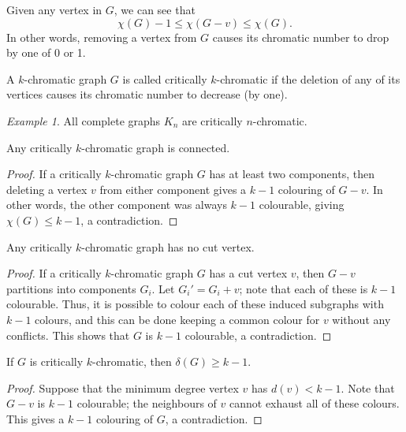 \documentclass[11pt]{article}
\theoremstyle{definition}
\theoremstyle{remark}
\newtheorem*{example}{Example}
\numberwithin{equation}{section}
\begin{document}
    \begin{lemma}
        Given any vertex in $G$, we can see that \[
            \chi(G) - 1 \leq \chi(G - v) \leq \chi(G).
        \] In other words, removing a vertex from $G$ causes its chromatic number to
        drop by one of 0 or 1.
    \end{lemma}

    \begin{definition}
        A $k$-chromatic graph $G$ is called critically $k$-chromatic if the deletion
        of any of its vertices causes its chromatic number to decrease (by one).
    \end{definition}
    \begin{example}
        All complete graphs $K_n$ are critically $n$-chromatic.
    \end{example}

    \begin{lemma}
        Any critically $k$-chromatic graph is connected.
    \end{lemma}
    \begin{proof}
        If a critically $k$-chromatic graph $G$ has at least two components, then
        deleting a vertex $v$ from either component gives a $k - 1$ colouring of $G -
        v$. In other words, the other component was always $k - 1$ colourable, giving
        $\chi(G) \leq k - 1$, a contradiction.
    \end{proof}

    \begin{lemma}
        Any critically $k$-chromatic graph has no cut vertex.
    \end{lemma}
    \begin{proof}
        If a critically $k$-chromatic graph $G$ has a cut vertex $v$, then $G - v$
        partitions into components $G_i$. Let $G_i' = G_i + v$; note that each of
        these is $k - 1$ colourable. Thus, it is possible to colour each of these
        induced subgraphs with $k - 1$ colours, and this can be done keeping a common
        colour for $v$ without any conflicts. This shows that $G$ is $k - 1$
        colourable, a contradiction.
    \end{proof}

    \begin{lemma}
        If $G$ is critically $k$-chromatic, then $\delta(G) \geq k - 1$.
    \end{lemma}
    \begin{proof}
        Suppose that the minimum degree vertex $v$ has $d(v) < k - 1$. Note that $G -
        v$ is $k - 1$ colourable; the neighbours of $v$ cannot exhaust all of these
        colours. This gives a $k - 1$ colouring of $G$, a contradiction.
    \end{proof}
\end{document}
